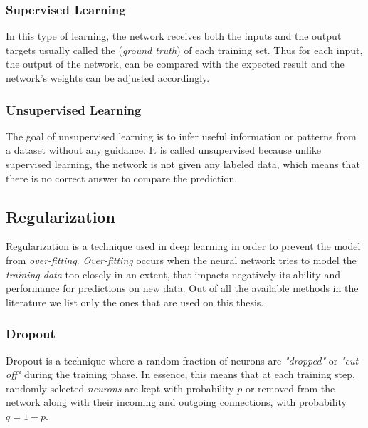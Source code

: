 \documentclass[a4paper, 12pt]{article}
\numberwithin{equation}{section}
\numberwithin{figure}{section}
\numberwithin{table}{section}
\begin{document}
	\newpage
	
	\subsubsection{Supervised Learning}
	
	In this type of learning, the network receives both the inputs and the output targets usually called the (\textit{ground truth}) of each training set. Thus for each input, the output of the network, can be compared with the expected result and the network's weights can be adjusted accordingly.
	
	\subsubsection{Unsupervised Learning}
	
	The goal of unsupervised learning is to infer useful information or patterns from a dataset without any guidance. It is called unsupervised because unlike supervised learning, the network is not given any labeled data, which means that there is no correct answer to compare the prediction.
	
	\subsection{Regularization}
	
	Regularization is a technique used in deep learning in order to prevent the model from \textit{over-fitting}. \textit{Over-fitting} occurs when the neural network tries to model the \textit{training-data} too closely in an extent, that impacts negatively its ability and performance for predictions on new data. Out of all the available methods in the literature we list only the ones that are used on this thesis.
	
	\subsubsection{Dropout}
	
	Dropout \cite{dropout} is a technique where a random fraction of neurons are \textit{"dropped"} or \textit{"cut-off" } during the training phase. In essence, this means that at each training step, randomly selected \textit{neurons} are kept with probability $p$ or removed from the network along with their incoming and outgoing connections, with probability $q=1-p$.
	
\end{document}
